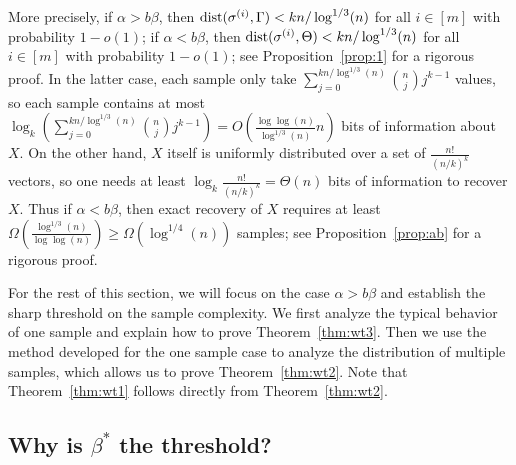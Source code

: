 \documentclass{article}
\begin{document}
More precisely, if $\alpha>b\beta$, then $\operatorname{dist}(\sigma^{(i)},\Gamma )< kn/\log^{1/3}(n)$ for all $i\in[m]$ with probability $1-o(1)$; if $\alpha<b\beta$, then $\operatorname{dist}(\sigma^{(i)}, \Theta)< kn/\log^{1/3}(n)$ for all $i\in[m]$ with probability $1-o(1)$; see Proposition~\ref{prop:1} for a rigorous proof.
In the latter case, each sample only take $\sum_{j=0}^{kn/\log^{1/3}(n)}\binom{n}{j}j^{k-1}$ values, so each sample contains at most $\log_k(\sum_{j=0}^{kn/\log^{1/3}(n)}\binom{n}{j}j^{k-1})=O(\frac{\log\log(n)}{\log^{1/3}(n)} n)$ bits of information about $X$. On the other hand, $X$ itself is uniformly distributed over a set of $\frac{n!}{(n/k)^k}$ vectors, so one needs at least $\log_k\frac{n!}{(n/k)^k}=\Theta(n)$ bits of information to recover $X$. Thus if $\alpha<b\beta$, then exact recovery of $X$ requires at least $\Omega(\frac{\log^{1/3}(n)}{\log\log(n)})\ge \Omega(\log^{1/4}(n))$ samples; see Proposition~\ref{prop:ab} for a rigorous proof.

For the rest of this section, we will focus on the case $\alpha>b\beta$ and establish the sharp threshold on the sample complexity. We first analyze the typical behavior of one sample and explain how to prove Theorem~\ref{thm:wt3}. Then we use the method developed for the one sample case to analyze the distribution of multiple samples, which allows us to prove Theorem~\ref{thm:wt2}. Note that Theorem~\ref{thm:wt1} follows directly from Theorem~\ref{thm:wt2}.

\subsection{Why is $\beta^\ast$ the threshold?} \label{sect:why}
\end{document}
